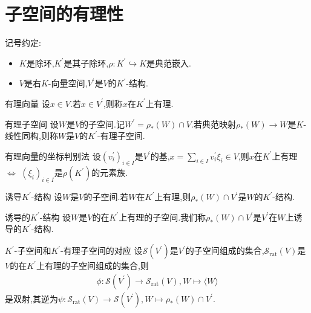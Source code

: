\section{子空间的有理性}

记号约定:

\begin{itemize}
	\item $K$是除环,$K^{\prime}$是其子除环,$\rho:K^{\prime}\hookrightarrow K$是典范嵌入.
	\item $V$是右$K$-向量空间,$V^{\prime}$是$V$的$K^{\prime}$-结构.
\end{itemize}

\begin{definition}{有理向量}{}
	设$x\in V$.若$x\in V^{\prime}$,则称$x$在$K^{\prime}$上有理.
\end{definition}

\begin{definition}{有理子空间}{}
	设$W$是$V$的子空间.记$W^{\prime}=\rho_{\ast}\left(W\right)\cap V$.若典范映射$\rho_{\ast}\left(W\right)\to W$是$K$-线性同构,则称$W$是$V$的$K^{\prime}$-有理子空间.
\end{definition}

\begin{proposition}{有理向量的坐标判别法}{}
	设$\left(v_{i}^{\prime}\right)_{i\in I}$是$V^{\prime}$的基,$x=\sum\limits_{i\in I}v_{i}^{\prime}\xi_{i}\in V$,则$x$在$K^{\prime}$上有理$\iff$ $\left(\xi_{i}\right)_{i\in I}$是$\rho\left(K^{\prime}\right)$的元素族.
\end{proposition}

\begin{proposition}{诱导$K^{\prime}$-结构}{}
	设$W$是$V$的子空间.若$W$在$K^{\prime}$上有理,则$\rho_{\ast}\left(W\right)\cap V^{\prime}$是$W$的$K^{\prime}$-结构.
\end{proposition}

\begin{definition}{诱导的$K^{\prime}$-结构}{}
	设$W$是$V$的在$K^{\prime}$上有理的子空间.我们称$\rho_{\ast}\left(W\right)\cap V^{\prime}$是$V^{\prime}$在$W$上诱导的$K^{\prime}$-结构.
\end{definition}

\begin{proposition}{$K^{\prime}$-子空间和$K^{\prime}$-有理子空间的对应}{}
	设$\mathcal{S}\left(V^{\prime}\right)$是$V^{\prime}$的子空间组成的集合,$\mathcal{S}_{\text{rat}}\left(V\right)$是$V$的在$K^{\prime}$上有理的子空间组成的集合,则
	\begin{align*}
		\phi:\mathcal{S}\left(V^{\prime}\right)\to\mathcal{S}_{\text{rat}}\left(V\right),W\mapsto\langle W\rangle
	\end{align*}
	是双射,其逆为$\psi:\mathcal{S}_{\text{rat}}\left(V\right)\to\mathcal{S}\left(V^{\prime}\right),W\mapsto \rho_{\ast}\left(W\right)\cap V^{\prime}$.
\end{proposition}

